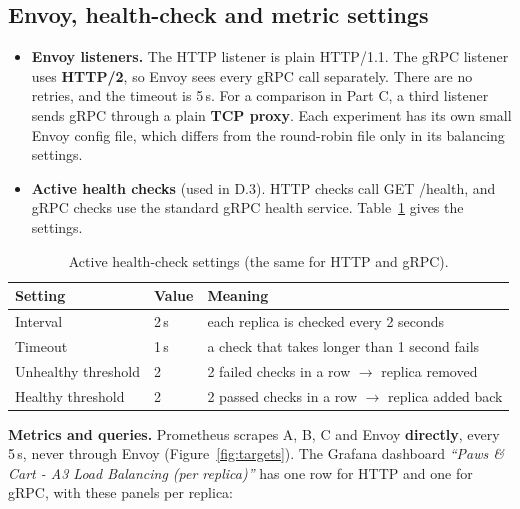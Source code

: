 \documentclass[10pt,a4paper]{article}
\newcommand{\codeus}{\textunderscore\allowbreak}
\newcommand{\code}[1]{{\small\ttfamily\let\_\codeus #1}}
\begin{document}
\subsection{Envoy, health-check and metric settings}

\begin{itemize}
\item \textbf{Envoy listeners.} The HTTP listener is plain HTTP/1.1. The gRPC listener uses \textbf{HTTP/2}, so
Envoy sees every gRPC call separately. There are no retries, and the timeout is 5\,s. For a comparison in Part C,
a third listener sends gRPC through a plain \textbf{TCP proxy}. Each experiment has its own small Envoy config file,
which differs from the round-robin file only in its balancing settings.
\item \textbf{Active health checks} (used in D.3). HTTP checks call \code{GET /health}, and gRPC checks use the
standard gRPC health service. Table~\ref{tab:hc} gives the settings.
\end{itemize}

\begin{table}[H]
\centering\small
\begin{tabular}{@{}l l l@{}}
\toprule
Setting & Value & Meaning \\
\midrule
Interval & 2\,s & each replica is checked every 2 seconds \\
Timeout & 1\,s & a check that takes longer than 1 second fails \\
Unhealthy threshold & 2 & 2 failed checks in a row $\to$ replica removed \\
Healthy threshold & 2 & 2 passed checks in a row $\to$ replica added back \\
\bottomrule
\end{tabular}
\caption{Active health-check settings (the same for HTTP and gRPC).}
\label{tab:hc}
\end{table}

\textbf{Metrics and queries.} Prometheus scrapes A, B, C and Envoy \textbf{directly}, every 5\,s, never through
Envoy (Figure~\ref{fig:targets}). The Grafana dashboard \emph{``Paws \& Cart - A3 Load Balancing (per replica)''} has
one row for HTTP and one for gRPC, with these panels per replica:
\end{document}
